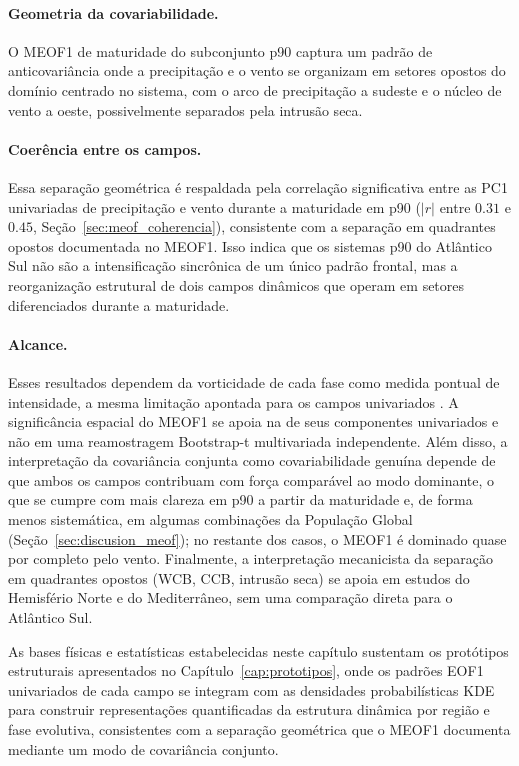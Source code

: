 \paragraph{Geometria da covariabilidade.}
O MEOF1 de maturidade do subconjunto p90 captura um padrão de anticovariância onde a precipitação e o vento se organizam em setores opostos do domínio centrado no sistema, com o arco de precipitação a sudeste e o núcleo de vento a oeste, possivelmente separados pela intrusão seca.

\paragraph{Coerência entre os campos.}
Essa separação geométrica é respaldada pela correlação significativa entre as PC1 univariadas de precipitação e vento durante a maturidade em p90 ($|r|$ entre $0.31$ e $0.45$, Seção~\ref{sec:meof_coherencia}), consistente com a separação em quadrantes opostos documentada no MEOF1. Isso indica que os sistemas p90 do Atlântico Sul não são a intensificação sincrônica de um único padrão frontal, mas a reorganização estrutural de dois campos dinâmicos que operam em setores diferenciados durante a maturidade.

\paragraph{Alcance.}
Esses resultados dependem da vorticidade de cada fase como medida pontual de intensidade, a mesma limitação apontada para os campos univariados \citep{sinclair1997objective}. A significância espacial do MEOF1 se apoia na de seus componentes univariados e não em uma reamostragem Bootstrap-t multivariada independente. Além disso, a interpretação da covariância conjunta como covariabilidade genuína depende de que ambos os campos contribuam com força comparável ao modo dominante, o que se cumpre com mais clareza em p90 a partir da maturidade e, de forma menos sistemática, em algumas combinações da População Global (Seção~\ref{sec:discusion_meof}); no restante dos casos, o MEOF1 é dominado quase por completo pelo vento. Finalmente, a interpretação mecanicista da separação em quadrantes opostos (WCB, CCB, intrusão seca) se apoia em estudos do Hemisfério Norte e do Mediterrâneo, sem uma comparação direta para o Atlântico Sul.

As bases físicas e estatísticas estabelecidas neste capítulo sustentam os protótipos estruturais apresentados no Capítulo~\ref{cap:prototipos}, onde os padrões EOF1 univariados de cada campo se integram com as densidades probabilísticas KDE para construir representações quantificadas da estrutura dinâmica por região e fase evolutiva, consistentes com a separação geométrica que o MEOF1 documenta mediante um modo de covariância conjunto.
